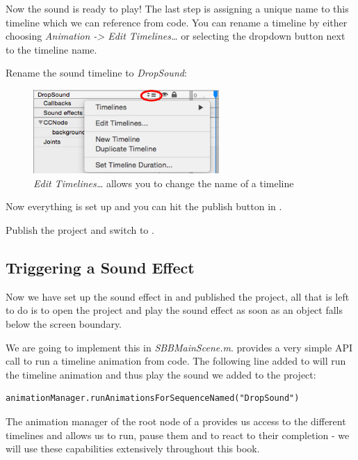 Now the sound is ready to play! The last step is assigning a unique name to this
timeline which we can reference from code. You can rename a timeline by either
choosing \textit{Animation -> Edit Timelines\ldots} or selecting the dropdown
button next to the timeline name.

\begin{leftbar}
Rename the sound timeline to  \textit{DropSound}:
\begin{figure}[H]
    \centering
    \includegraphics[width=200pt]{images/Chapter2/edit_timeline.png}
    \caption{\textit{Edit Timelines\ldots} allows you to change the name of a
    timeline}
\end{figure}
\end{leftbar}

Now everything is set up and you can hit the publish button in \SB{}.

\begin{leftbar}
Publish the \SB{} project and switch to \xcode{}.
\end{leftbar}

\subsection{Triggering a Sound Effect}
Now we have set up the sound effect in \SB{} and published the project, all that
is left to do is to open the \xcode{} project and play the sound effect as soon
as an object falls below the screen boundary.

We are going to implement this in \textit{SBBMainScene.m}. \cocos{} provides a
very simple API call to run a timeline animation from code. The following line
added to  will run the timeline animation and thus play the
sound we added to the project:
\begin{lstlisting}
animationManager.runAnimationsForSequenceNamed("DropSound")
\end{lstlisting}
The animation manager of the root node of a \ccbfile{} provides us access to the
different timelines and allows us to run, pause them and to react to their
completion - we will use these capabilities extensively throughout this book.

